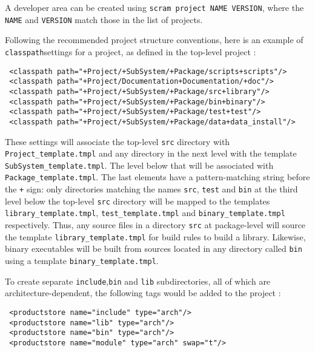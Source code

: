 \ni A developer area can be created using \texttt{scram project NAME
  VERSION}, where the \texttt{NAME} and \texttt{VERSION} match those
in the list of projects.


Following the recommended project structure conventions, here is an
example of \lbkt\texttt{classpath}\rbkt settings for a project, as
defined in the top-level project \buildfile:

\small{
\begin{verbatim} 
 <classpath path="+Project/+SubSystem/+Package/scripts+scripts"/>
 <classpath path="+Project/Documentation+Documentation/+doc"/>
 <classpath path="+Project/+SubSystem/+Package/src+library"/>
 <classpath path="+Project/+SubSystem/+Package/bin+binary"/>
 <classpath path="+Project/+SubSystem/+Package/test+test"/>
 <classpath path="+Project/+SubSystem/+Package/data+data_install"/>
\end{verbatim}}\normalsize

\ni These settings will associate the top-level \texttt{src}
directory with \texttt{Project\_template.tmpl} and any directory in the next
level with the template \texttt{SubSystem\_template.tmpl}. 
The level below that will be associated with \texttt{Package\_template.tmpl}.
The last elements have a pattern-matching string before the \texttt{+}
sign: only directories matching the names \texttt{src},
\texttt{test} and \texttt{bin} at the third level below
the top-level \texttt{src} directory will be mapped to the
templates \texttt{library\_template.tmpl},
\texttt{test\_template.tmpl} and
\texttt{binary\_template.tmpl} respectively.  Thus, any
source files in a directory \texttt{src} at package-level will
source the template \texttt{library\_template.tmpl} for build
rules to build a library. Likewise, binary executables will be
built from sources located in any directory called
\texttt{bin} using a template \texttt{binary\_template.tmpl}.

To create separate \texttt{include},\texttt{bin} and \texttt{lib} subdirectories, all of which are 
architecture-dependent, the following tags would be added to the project \buildfile:

\small{
\begin{verbatim} 
 <productstore name="include" type="arch"/>
 <productstore name="lib" type="arch"/>
 <productstore name="bin" type="arch"/>
 <productstore name="module" type="arch" swap="t"/>
\end{verbatim}}\normalsize

